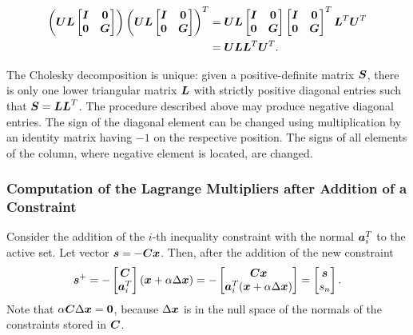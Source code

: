 \begin{equation*}
\begin{split}
\left(\mbox{\boldmath $U$} \mbox{\boldmath $L$} \begin{bmatrix} \mbox{\boldmath $I$} & \mbox{\boldmath $0$}\\ \mbox{\boldmath $0$} & \mbox{\boldmath $G$} \end{bmatrix}  \right) 
\left(\mbox{\boldmath $U$} \mbox{\boldmath $L$} \begin{bmatrix} \mbox{\boldmath $I$} & \mbox{\boldmath $0$}\\ \mbox{\boldmath $0$} & \mbox{\boldmath $G$} \end{bmatrix}  \right)^T
&= 
\mbox{\boldmath $U$} \mbox{\boldmath $L$} 
\begin{bmatrix} \mbox{\boldmath $I$} & \mbox{\boldmath $0$}\\ \mbox{\boldmath $0$} & \mbox{\boldmath $G$} \end{bmatrix}  
\begin{bmatrix} \mbox{\boldmath $I$} & \mbox{\boldmath $0$}\\ \mbox{\boldmath $0$} & \mbox{\boldmath $G$} \end{bmatrix} ^T
\mbox{\boldmath $L$}^T \mbox{\boldmath $U$}^T \\ 
&= 
\mbox{\boldmath $U$} \mbox{\boldmath $L$} \mbox{\boldmath $L$}^T \mbox{\boldmath $U$}^T.
\end{split}
\end{equation*}

The Cholesky decomposition is unique: given a positive-definite matrix $\mbox{\boldmath $S$}$,
there is only one lower triangular matrix $\mbox{\boldmath $L$}$ with strictly positive diagonal 
entries such that $\mbox{\boldmath $S$} = \mbox{\boldmath $L$}\mbox{\boldmath $L$}^T$. The procedure described above may
produce negative diagonal entries. The sign of the diagonal element can be changed 
using multiplication by an identity matrix having $-1$ on the respective position.
The signs of all elements of the column, where negative element is located, are 
changed. 


\subsubsection{Computation of the Lagrange Multipliers after Addition of a Constraint}
Consider the addition of the $i$-th inequality constraint with the normal $\mbox{\boldmath $a$}_i^T$ 
to the active set. Let vector $\mbox{\boldmath $s$} = -\mbox{\boldmath $C$}\mbox{\boldmath $x$}$. Then, after the addition of 
the new constraint
%
\begin{align*}
\mbox{\boldmath $s$}^{+} 
= 
    -\begin{bmatrix} 
        \mbox{\boldmath $C$} \\ 
        \mbox{\boldmath $a$}_i^T
    \end{bmatrix}
    \left(\mbox{\boldmath $x$}+\alpha\Delta\mbox{\boldmath $x$}\right) 
=
    -\begin{bmatrix} 
        \mbox{\boldmath $C$}\mbox{\boldmath $x$}\\ 
        \mbox{\boldmath $a$}_i^T(\mbox{\boldmath $x$}+\alpha\Delta\mbox{\boldmath $x$})
    \end{bmatrix}
  = \begin{bmatrix} \mbox{\boldmath $s$} \\ s_n \end{bmatrix}.
\end{align*}
%
Note that $\alpha\mbox{\boldmath $C$}\Delta\mbox{\boldmath $x$} = \mbox{\boldmath $0$}$, because $\Delta\mbox{\boldmath $x$}$ is in the null space of
the normals of the constraints stored in $\mbox{\boldmath $C$}$.

